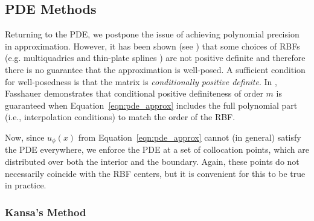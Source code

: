 \documentclass{report}
\begin{document}
{%

\subsection{PDE Methods} 
Returning to the PDE, we postpone the issue of  achieving polynomial precision in approximation. However, it has been shown (see \cite{Fasshauer2007, Iske2004}) that some choices of RBFs (e.g. multiquadrics and thin-plate splines \cite{Hon2001}) are not positive definite and therefore there is no guarantee that the approximation is well-posed. A sufficient condition for well-posedness is that the matrix is \emph{conditionally positive definite}. In \cite{Fasshauer2007}, Fasshauer demonstrates that conditional positive definiteness of order $m$ is guaranteed when Equation~\ref{eqn:pde_approx} includes the full polynomial part (i.e., interpolation conditions) to match the order of the RBF. 

Now, since $u_{\phi}(x)$ from Equation~\ref{eqn:pde_approx} cannot (in general) satisfy the PDE everywhere, we enforce the PDE at a set of collocation points, which are  distributed over both the interior and the boundary. Again, these points do not necessarily coincide with the RBF centers, but it is convenient for this to be true in practice. 

\subsubsection{Kansa's Method}

}
\end{document}
